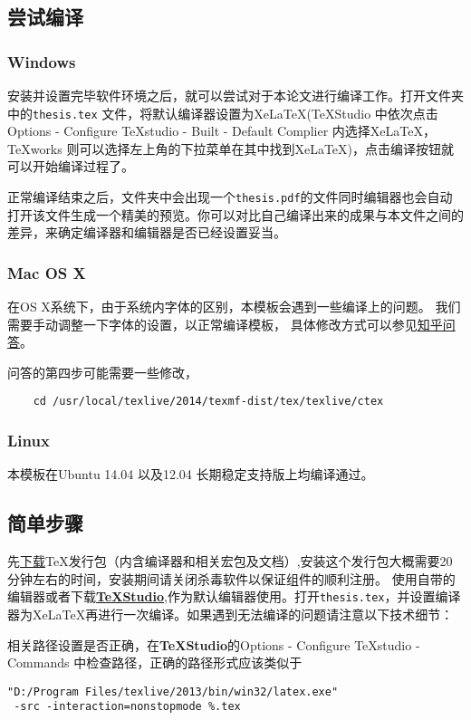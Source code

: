 \subsection{尝试编译}
\subsubsection{Windows}
安装并设置完毕软件环境之后，就可以尝试对于本论文进行编译工作。打开文件夹中的\verb|thesis.tex| 文件，将默认编译器设置为Xe\LaTeX(\TeX Studio 中依次点击Options - Configure TeXstudio - Built - Default Complier 内选择Xe\LaTeX ，\TeX works 则可以选择左上角的下拉菜单在其中找到Xe\LaTeX )，点击编译按钮就可以开始编译过程了。

正常编译结束之后，文件夹中会出现一个\verb|thesis.pdf|的文件同时编辑器也会自动打开该文件生成一个精美的预览。你可以对比自己编译出来的成果与本文件之间的差异，来确定编译器和编辑器是否已经设置妥当。
\subsubsection{Mac OS X}

在OS X系统下，由于系统内字体的区别，本模板会遇到一些编译上的问题。 我们需要手动调整一下字体的设置，以正常编译模板， 具体修改方式可以参见\href{http://www.zhihu.com/question/22906637}{知乎问答}。 

问答的第四步可能需要一些修改，
\begin{verbatim}
	cd /usr/local/texlive/2014/texmf-dist/tex/texlive/ctex
\end{verbatim}

\subsubsection{Linux}
本模板在Ubuntu 14.04 以及12.04 长期稳定支持版上均编译通过。

\subsection{简单步骤}
先\href{https://www.tug.org/texlive/acquire-iso.html}{下载}\TeX 发行包（内含编译器和相关宏包及文档）,安装这个发行包大概需要20分钟左右的时间，安装期间请关闭杀毒软件以保证组件的顺利注册。
使用自带的编辑器或者下载\href{http://texstudio.sourceforge.net/}{\textbf{\TeX Studio}},作为默认编辑器使用。打开\verb|thesis.tex|，并设置编译器为Xe\LaTeX 再进行一次编译。如果遇到无法编译的问题请注意以下技术细节：

相关路径设置是否正确，在\textbf{\TeX Studio}的Options - Configure TeXstudio - Commands 中检查路径，正确的路径形式应该类似于

\begin{verbatim}
"D:/Program Files/texlive/2013/bin/win32/latex.exe"
 -src -interaction=nonstopmode %.tex
\end{verbatim}

























